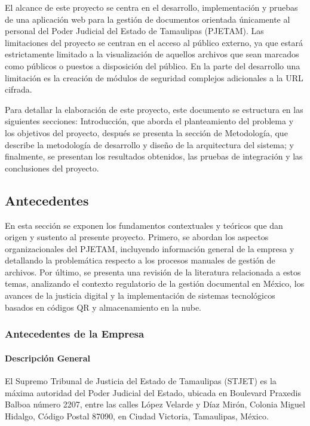 El alcance de este proyecto se centra en el desarrollo, implementación y pruebas de una aplicación web para la gestión de documentos orientada únicamente al personal del Poder Judicial del Estado de Tamaulipas (PJETAM). Las limitaciones del proyecto se centran en el acceso al público externo, ya que estará estrictamente limitado a la visualización de aquellos archivos que sean marcados como públicos o puestos a disposición del público. En la parte del desarrollo una limitación es la creación de módulos de seguridad complejos adicionales a la URL cifrada.

Para detallar la elaboración de este proyecto, este documento se estructura en las siguientes secciones: Introducción, que aborda el planteamiento del problema y los objetivos del proyecto, después se presenta la sección de Metodología, que describe la metodología de desarrollo y diseño de la arquitectura del sistema; y finalmente, se presentan los resultados obtenidos, las pruebas de integración y las conclusiones del proyecto.

\subsection{Antecedentes}
\label{sec:antecedentes}
En esta sección se exponen los fundamentos contextuales y teóricos que dan origen y sustento al presente proyecto. Primero, se abordan los aspectos organizacionales del PJETAM, incluyendo información general de la empresa y detallando la problemática respecto a los procesos manuales de gestión de archivos. Por último, se presenta una revisión de la literatura relacionada a estos temas, analizando el contexto regulatorio de la gestión documental en México, los avances de la justicia digital y la implementación de sistemas tecnológicos basados en códigos QR y almacenamiento en la nube. 

\subsubsection{Antecedentes de la Empresa}
\label{subsec:antecedentes_empresa}
\paragraph{Descripción General}
\label{par:descripcion_antecedentes_empresa}
El Supremo Tribunal de Justicia del Estado de Tamaulipas (STJET) es la máxima autoridad del Poder Judicial del Estado, ubicada en Boulevard Praxedis Balboa número 2207, entre las calles López Velarde y Díaz Mirón, Colonia Miguel Hidalgo, Código Postal 87090, en Ciudad Victoria, Tamaulipas, México.

